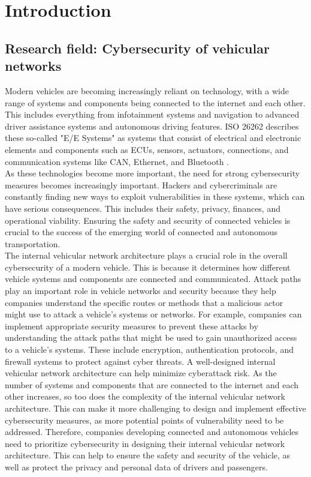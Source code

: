 \chapter{Introduction}
\label{chp:introduction}

\section{Research field: Cybersecurity of vehicular networks}\label{sec:field}

Modern vehicles are becoming increasingly reliant on technology, with a wide range of systems and components being connected to the internet and each other. 
This includes everything from infotainment systems and navigation to advanced driver assistance systems and autonomous driving features. 
ISO 26262 describes these so-called "E/E Systems" as systems that consist of electrical and electronic elements and components such as ECUs, sensors, actuators, connections, and communication systems like CAN, Ethernet, and Bluetooth \cite{iso26262}.
\\

As these technologies become more important, the need for strong cybersecurity measures becomes increasingly important. 
Hackers and cybercriminals are constantly finding new ways to exploit vulnerabilities in these systems, which can have serious consequences. 
This includes their safety, privacy, finances, and operational viability. Ensuring the safety and security of connected vehicles is crucial to the success of the emerging world of connected and autonomous transportation.
\\

The internal vehicular network architecture plays a crucial role in the overall cybersecurity of a modern vehicle. 
This is because it determines how different vehicle systems and components are connected and communicated. 
Attack paths play an important role in vehicle networks and security because they help companies understand the specific routes or methods that a malicious actor might use to attack a vehicle's systems or networks. 
For example, companies can implement appropriate security measures to prevent these attacks by understanding the attack paths that might be used to gain unauthorized access to a vehicle's systems. These include encryption, authentication protocols, and firewall systems to protect against cyber threats. 
A well-designed internal vehicular network architecture can help minimize cyberattack risk. 
As the number of systems and components that are connected to the internet and each other increases, so too does the complexity of the internal vehicular network architecture. 
This can make it more challenging to design and implement effective cybersecurity measures, as more potential points of vulnerability need to be addressed. 
Therefore, companies developing connected and autonomous vehicles need to prioritize cybersecurity in designing their internal vehicular network architecture. 
This can help to ensure the safety and security of the vehicle, as well as protect the privacy and personal data of drivers and passengers. 
\\

